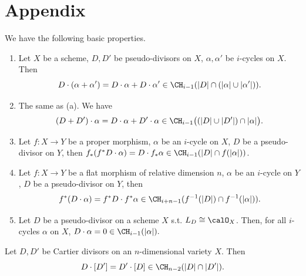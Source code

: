 \section{Appendix}

  \begin{proposition}\label{prop:basic_properties_of_intersection_with_pseudo-divisors}
    We have the following basic properties.
    \begin{enumerate}
      \item Let $X$ be a scheme, $D,D'$ be pseudo-divisors on $X$, $\alpha,\alpha'$ be $i$-cycles on $X$.
        Then 
        \[ D \cdot (\alpha + \alpha') = D \cdot \alpha + D \cdot \alpha' \in \CH_{i-1}(|D| \cap (|\alpha| \cup |\alpha'|)). \]

      \item The same as (a). 
        We have 
        \[ (D + D') \cdot \alpha = D \cdot \alpha + D' \cdot \alpha \in \CH_{i-1}\big((|D| \cup |D'|) \cap |\alpha|\big). \]

      \item Let $f: X \to Y$ be a proper morphism, $\alpha$ be an $i$-cycle on $X$, $D$ be a pseudo-divisor on $Y$, 
        then $f_* (f^* D \cdot \alpha) = D \cdot f_* \alpha \in \CH_{i-1}(|D| \cap f(|\alpha|))$.

      \item Let $f:X \to Y$ be a flat morphism of relative dimension $n$, $\alpha$ be an $i$-cycle on $Y$, $D$ be a pseudo-divisor on $Y$, then 
        \[ f^* (D \cdot \alpha) = f^* D \cdot f^* \alpha \in \CH_{i+n-1}(f^{-1} (|D|) \cap f^{-1}(|\alpha|)). \]

      \item Let $D$ be a pseudo-divisor on a scheme $X$ s.t. $L_D \cong \calO_X$.
        Then, for all $i$-cycles $\alpha$ on $X$, $D \cdot \alpha = 0 \in \CH_{i-1} (|\alpha|).$
    \end{enumerate} 
  \end{proposition}

    \begin{theorem}\label{thm:commutativity_of_intersection_with_cartier_divisors}
    Let $D,D'$ be Cartier divisors on an $n$-dimensional variety $X$.
    Then 
    \[  D \cdot [D'] = D' \cdot [D] \in \CH_{n-2}(|D| \cap |D'|). \]
  \end{theorem}